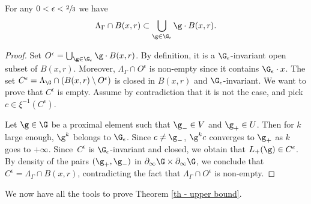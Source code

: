 \begin{lemma} \label{lem - covering the limit set}
For any $0<\epsilon< \sfrac{2}{3}$ we have
\[\Lambda_\Gamma\cap B(x,r) \subset \bigcup_{\g \in \G_\epsilon} \g \cdot B(x,r).\]
\end{lemma}

\begin{proof}
Set $O^\epsilon = \bigcup_{\g \in \G_\epsilon} \g \cdot B(x,r)$.
By definition, it is a $\G_\epsilon$-invariant open subset of $B(x,r)$. Moreover, $\Lambda_\Gamma \cap O^\epsilon$ is non-empty since it contains $\G_\epsilon \cdot x$. The set $C^\epsilon = \Lambda_\G \cap (B(x,r)\setminus O^\epsilon)$ is closed in $B(x,r)$ and $\G_\epsilon$-invariant. We want to prove that $C^\epsilon$ is empty. Assume by contradiction that it is not the case, and pick $c \in \xi^{-1}(C^\epsilon)$.

Let $\g \in \G$ be a proximal element such that $\g_- \in V$ and $\g_+ \in U$. Then for $k$ large enough, $\g^k$ belongs to $\G_\epsilon$. Since $c\neq \g_-$, $\g^k c$ converges to $\g_+$ as $k$ goes to $+\infty$. Since~$C^\epsilon$ is $\G_\epsilon$-invariant and closed, we obtain that $L_+(\g)\in C^\epsilon$. By density of the pairs $(\g_+,\g_-)$ in $\partial_\infty \G\times\partial_\infty\G$, we conclude that $C^\epsilon = \Lambda_\Gamma\cap B(x,r)$, contradicting the fact that $\Lambda_\Gamma \cap O^\epsilon$ is non-empty.
\end{proof}

We now have all the tools to prove Theorem \ref{th - upper bound}.

